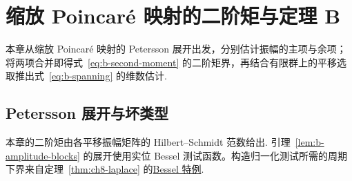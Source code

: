 \chapter{缩放 Poincaré 映射的二阶矩与定理 B}
\label{chap:spanning}

\begin{chapterguide}
本章从缩放 Poincaré 映射的 Petersson 展开出发，分别估计振幅的主项与余项；将两项合并即得式~\eqref{eq:b-second-moment} 的二阶矩界，再结合有限群上的平移选取推出式~\eqref{eq:b-spanning} 的维数估计.
\end{chapterguide}

\section{Petersson 展开与坏类型}
\label{sec:b-amplitude}

本章的二阶矩由各平移振幅矩阵的 Hilbert--Schmidt 范数给出. 引理~\ref{lem:b-amplitude-blocks} 的展开使用实位 Bessel 测试函数。构造归一化测试所需的周期下界来自定理~\ref{thm:ch8-laplace} 的\hyperref[use:ch8-bessel]{Bessel 特例}.

